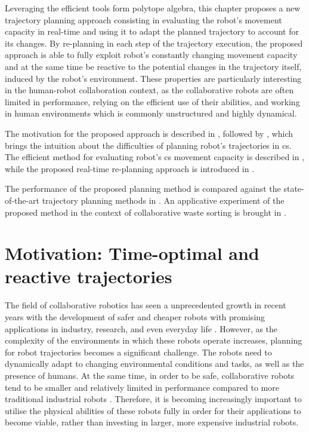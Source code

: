 Leveraging the efficient tools form polytope algebra, this chapter proposes a new trajectory planning approach consisting in evaluating the robot's movement capacity in real-time and using it to adapt the planned trajectory to account for its changes. By re-planning in each step of the trajectory execution, the proposed approach is able to fully exploit robot's constantly changing movement capacity and at the same time be reactive to the potential changes in the trajectory itself, induced by the robot's environment. 
These properties are particularly interesting in the human-robot collaboration context, as the collaborative robots are often limited in performance, relying on the efficient use of their abilities, and working in human environments which is commonly unstructured and highly dynamical. 


The motivation for the proposed approach is described in , followed by , which brings the intuition about the difficulties of planning robot's trajectories in \gls{cs}. The efficient method for evaluating robot's \gls{cs} movement capacity is described in , while the proposed real-time re-planning approach is introduced in . 

The performance of the proposed planning method is compared against the state-of-the-art trajectory planning methods in . An applicative experiment of the proposed method in the context of collaborative waste sorting is brought in .

\section{Motivation: Time-optimal and reactive trajectories}
\label{ch:topca_motivation}
The field of collaborative robotics has seen a unprecedented growth in recent years with the development of safer and cheaper robots with promising applications in industry, research, and even everyday life \cite{ajoudani2018progress}. However, as the complexity of the environments in which these robots operate increases, planning for robot trajectories becomes a significant challenge.  The robots need to dynamically adapt to changing environmental conditions and tasks, as well as the presence of humans. 
At the same time, in order to be safe, collaborative robots tend to be smaller and relatively limited in performance compared to more traditional industrial robots \cite{smu}. Therefore, it is becoming increasingly important to utilise the physical abilities of these robots fully in order for their applications to become viable, rather than investing in larger, more expensive industrial robots. 


